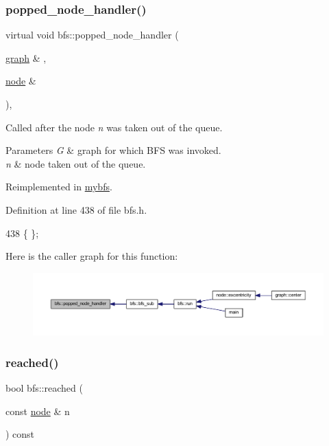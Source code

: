\subsubsection{\texorpdfstring{popped\+\_\+node\+\_\+handler()}{popped\_node\_handler()}}
{\footnotesize\ttfamily virtual void bfs\+::popped\+\_\+node\+\_\+handler (\begin{DoxyParamCaption}\item[{\mbox{\hyperlink{classgraph}{graph}} \&}]{,  }\item[{\mbox{\hyperlink{classnode}{node}} \&}]{ }\end{DoxyParamCaption})\hspace{0.3cm}{\ttfamily [inline]}, {\ttfamily [virtual]}}



Called after the node {\itshape n} was taken out of the queue. 


\begin{DoxyParams}{Parameters}
{\em G} & graph for which B\+FS was invoked. \\
\hline
{\em n} & node taken out of the queue. \\
\hline
\end{DoxyParams}


Reimplemented in \mbox{\hyperlink{classmybfs_a9d6e9e39f16d92ce1bcf368fe92b6856}{mybfs}}.



Definition at line 438 of file bfs.\+h.


\begin{DoxyCode}
438 \{ \};
\end{DoxyCode}
Here is the caller graph for this function\+:\nopagebreak
\begin{figure}[H]
\begin{center}
\leavevmode
\includegraphics[width=350pt]{classbfs_a09c7e35a4c20a24f1a54d63a0a9319a5_icgraph}
\end{center}
\end{figure}
\mbox{\label{classbfs_ab1a7882a7d56e0e72bbe1a344381bdae}} 
\subsubsection{\texorpdfstring{reached()}{reached()}}
{\footnotesize\ttfamily bool bfs\+::reached (\begin{DoxyParamCaption}\item[{const \mbox{\hyperlink{classnode}{node}} \&}]{n }\end{DoxyParamCaption}) const\hspace{0.3cm}{\ttfamily [inline]}}



